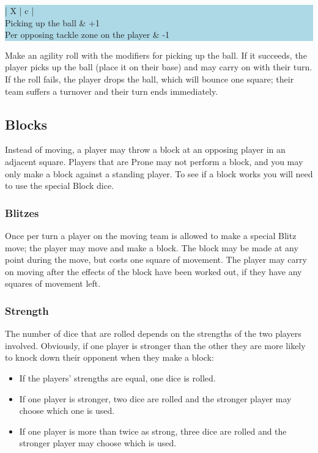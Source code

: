 \begin{multicols}{2}
\medskip
\begingroup\setlength{\fboxsep}{0pt}\colorbox{lightBlue}{%
\begin{tabularx}{\linewidth}{ | X | c | }
\hline
{} \\
\hline
Picking up the ball & +1 \\
\hline
Per opposing tackle zone on the player & -1 \\
\hline
\end{tabularx}%
}\endgroup
\medskip

\par Make an agility roll with the modifiers for picking up the ball. If it succeeds, the player picks up the ball (place it on their base) and may carry on with their turn. If the roll fails, the player drops the ball, which will bounce one square; their team suffers a turnover and their turn ends immediately.

\subsection{Blocks}
\par Instead of moving, a player may throw a block at an opposing player in an adjacent square.  Players that are Prone may not perform a block,  and you may only make a block against a standing player. To see if a block works you will need to use the special Block dice.

\subsubsection{Blitzes}
\par Once per turn a player on the moving team is allowed to make a special Blitz move; the player may move and make a block. The block may be made at any point during the move, but costs one square of movement. The player may carry on moving after the effects of the block have been worked out, if they have any squares of movement left.

\subsubsection{Strength}
\par The number of dice that are rolled depends on the strengths of the two players involved. Obviously, if one player is stronger than the other they are more likely to knock down their opponent when they make a block:

\begin{itemize}
\item If the players' strengths are equal, one dice is rolled.
\item If one player is stronger, two dice are rolled and the stronger player may choose which one is used.
\item If one player is more than twice as strong, three dice are rolled and the stronger player may choose which is used.
\end{itemize}


\end{multicols}
